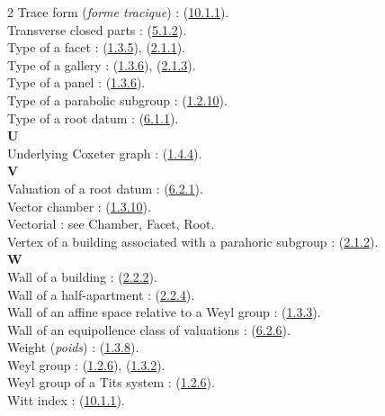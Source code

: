 \documentclass[12pt,a4paper,oneside,english]{smfart}
\newcommand{\btref}[1]{\hyperlink{bt:#1}{#1}}
\theoremstyle{definition}
\theoremstyle{bt}
\begin{document}
\begin{multicols}{2}
Trace form (\emph{forme tracique}) : (\btref{10.1.1}).\\
Transverse closed parts : (\btref{5.1.2}).\\
Type of a facet : (\btref{1.3.5}), (\btref{2.1.1}).\\
Type of a gallery : (\btref{1.3.6}), (\btref{2.1.3}).\\
Type of a panel : (\btref{1.3.6}).\\
Type of a parabolic subgroup : (\btref{1.2.10}).\\
Type of a root datum : (\btref{6.1.1}).\\
\textbf{U}\\
Underlying Coxeter graph : (\btref{1.4.4}).\\
\textbf{V}\\
Valuation of a root datum : (\btref{6.2.1}).\\
Vector chamber : (\btref{1.3.10}).\\
Vectorial : see Chamber, Facet, Root.\\
Vertex of a building associated with a parahoric subgroup : (\btref{2.1.2}).\\
\textbf{W}\\
Wall of a building : (\btref{2.2.2}).\\
Wall of a half-apartment : (\btref{2.2.4}).\\
Wall of an affine space relative to a Weyl group : (\btref{1.3.3}).\\
Wall of an equipollence class of valuations : (\btref{6.2.6}).\\
Weight (\emph{poids}) : (\btref{1.3.8}).\\
Weyl group : (\btref{1.2.6}), (\btref{1.3.2}).\\
Weyl group of a Tits system : (\btref{1.2.6}).\\
Witt index : (\btref{10.1.1}).\\
\end{multicols}
\normalsize
\par\endgroup
\end{document}
